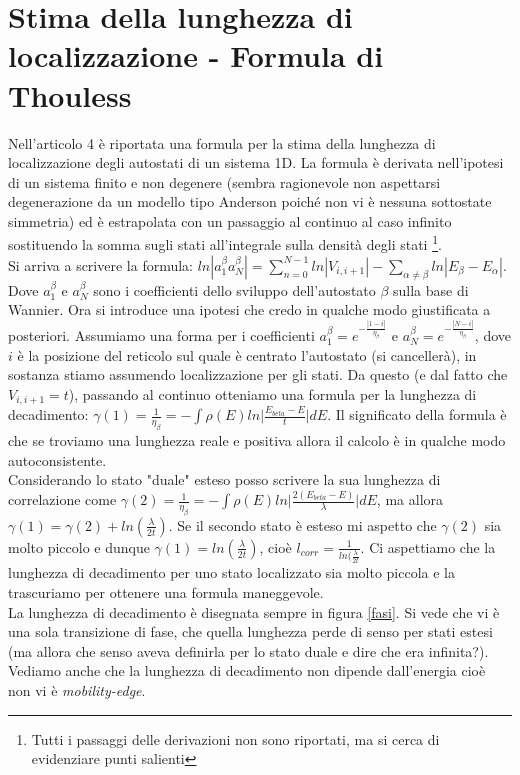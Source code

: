 \documentclass[10pt,a4paper]{article}
\begin{document}
\section{Stima della lunghezza di localizzazione - Formula di Thouless}
Nell'articolo 4 è riportata una formula per la stima della lunghezza di localizzazione degli autostati di un sistema 1D. La formula è derivata nell'ipotesi di un sistema finito e non degenere (sembra ragionevole non aspettarsi degenerazione da un modello tipo Anderson poiché non vi è nessuna sottostate simmetria) ed è estrapolata con un passaggio al continuo al caso infinito sostituendo la somma sugli stati all'integrale sulla densità degli stati \footnote{Tutti i passaggi delle derivazioni non sono riportati, ma si cerca di evidenziare  punti salienti}.\\
Si arriva a scrivere la formula: $ln | a_1^{\beta} a_N^{\beta}| = \sum_{n = 0}^{N-1} ln | V_{i, i+1} | - \sum_{\alpha \neq \beta} ln | E_{\beta} - E_{\alpha} |$. Dove $a_1^{\beta}$ e $a_N^{\beta}$ sono i coefficienti dello sviluppo dell'autostato $\beta$ sulla base di Wannier. Ora si introduce una ipotesi che credo in qualche modo giustificata a posteriori. Assumiamo una forma per i coefficienti $a_1^{\beta} = e^{-\frac{|1-i|}{\eta_{\beta}}}$ e $a_N^{\beta} = e^{-\frac{|N-i|}{\eta_{\beta}}}$, dove $i$ è la posizione del reticolo sul quale è centrato l'autostato (si cancellerà), in sostanza stiamo assumendo localizzazione per gli stati.
Da questo (e dal fatto che $V_{i, i+1} = t$), passando al continuo otteniamo una formula per la lunghezza di decadimento: $\gamma(1) = \frac{1}{\eta_{\beta}} = -\int \rho (E) ln \vert \frac{E_{beta} - E}{t} \vert dE$. Il significato della formula è che se troviamo una lunghezza reale e positiva allora il calcolo è in qualche modo autoconsistente.\\
Considerando lo stato "duale" esteso posso scrivere la sua lunghezza di correlazione come $\gamma(2) = \frac{1}{\eta_{\beta}} = -\int \rho (E) ln \vert \frac{2(E_{beta} - E)}{\lambda} \vert dE$, ma allora $\gamma(1) = \gamma(2) + ln(\frac{\lambda}{2 t})$. Se il secondo stato è esteso mi aspetto che $\gamma(2)$ sia molto piccolo e dunque $\gamma(1) = ln(\frac{\lambda}{2 t})$, cioè $l_{corr} = \frac{1}{ln(\frac{\lambda}{2 t}}$. Ci aspettiamo che la lunghezza di decadimento per uno stato localizzato sia molto piccola e la trascuriamo per ottenere una formula maneggevole.\\
La lunghezza di decadimento è disegnata sempre in figura \ref{fasi}. Si vede che vi è una sola transizione di fase, che quella lunghezza perde di senso per stati estesi (ma allora che senso aveva definirla per lo stato duale e dire che era infinita?). Vediamo anche che la lunghezza di decadimento non dipende dall'energia cioè non vi è \emph{mobility-edge}.\\
\end{document}
